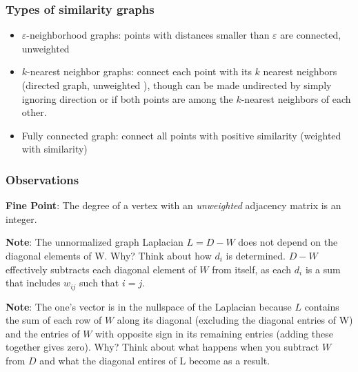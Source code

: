 \documentclass{article}
\begin{document}
        \subsubsection{Types of similarity graphs}
        \begin{itemize}
        \item\ensuremath{\varepsilon}-neighborhood graphs: points with distances
smaller than \ensuremath{\varepsilon} are connected, unweighted
        \item\ensuremath{k}-nearest neighbor graphs: connect each point with its
\ensuremath{k} nearest neighbors (directed graph, unweighted ), though can be
made undirected by simply ignoring direction or if both points are among the
\ensuremath{k}-nearest neighbors of each other.
        \item Fully connected graph: connect all points with positive
similarity (weighted with similarity)
        \end{itemize}
        \subsubsection{Observations} 
        \textbf{Fine Point}: The degree of a vertex with an \emph{unweighted}
adjacency matrix is an integer. 

        \textbf{Note}: The unnormalized graph Laplacian
\ensuremath{L = D - W} does not depend on the diagonal elements of W. Why? Think
about how \ensuremath{d_{i}} is determined. \ensuremath{D - W} effectively
subtracts each diagonal element of \ensuremath{W} from itself, as each
\ensuremath{d_{i}} is a sum that includes \ensuremath{w_{ij}} such that
\ensuremath{i=j}.  
        
        \textbf{Note}: The one's vector is in the nullspace of the Laplacian
because \ensuremath{L} contains the sum of each row of \ensuremath{W} along its
diagonal (excluding the diagonal entries of W) and the entries of \ensuremath{W}
with opposite sign in its remaining entries (adding these together gives zero).
Why? Think about what happens when you subtract \ensuremath{W} from
\ensuremath{D} and what the diagonal entires of L become as a result.
\end{document}
